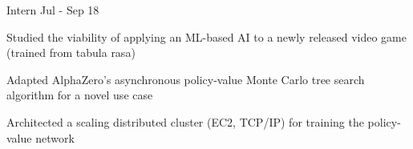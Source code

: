 \documentclass[letterpaper, 10pt]{article}
\begin{document}
Intern \hfill Jul - Sep 18
\begin{compact}
	\item Studied the viability of applying an ML-based AI to a newly released video game (trained from tabula rasa)
	\item Adapted AlphaZero's asynchronous policy-value Monte Carlo tree search algorithm for a novel use case
	\item Architected a scaling distributed cluster (EC2, TCP/IP) for training the policy-value network
\end{compact}
\end{document}
